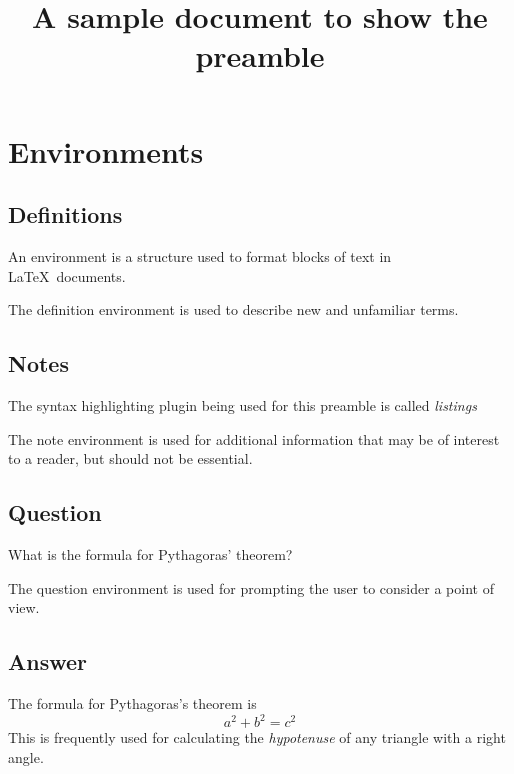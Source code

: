 \documentclass[12pt]{article}
\title{A sample document to show the preamble}
\begin{document}
    \maketitle
    \tableofcontents
    
    \section{Environments}

    \subsection{Definitions}
    \begin{definition}
        An environment is a structure used to format blocks of text in \LaTeX~documents.
    \end{definition}

    The definition environment is used to describe new and unfamiliar terms.
    
    \subsection{Notes}

    \begin{note}
        The syntax highlighting plugin being used for this preamble is called \emph{listings}    
    \end{note}

    The note environment is used for additional information that may be of interest to a reader, but should not be essential.

    \subsection{Question}

    \begin{question}
        What is the formula for Pythagoras' theorem?
    \end{question}

    The question environment is used for prompting the user to consider a point of view.

    \subsection{Answer}
    
    \begin{answer}
        The formula for Pythagoras's theorem is \[
          a^2+b^2=c^2  
        \]
        This is frequently used for calculating the \emph{hypotenuse} of any triangle with a right angle.
    \end{answer}
\end{document}
